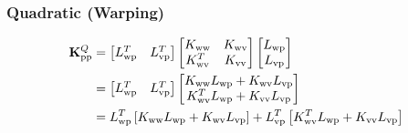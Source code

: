 \subsubsection{Quadratic (Warping)}
\[
\begin{aligned}
\mathbf{K}^Q_{\rm pp}
&= \begin{bmatrix}
    L_{\rm wp}^T & L_{\rm vp}^T
\end{bmatrix}
\begin{bmatrix}
    K_{\rm ww} & K_{\rm wv} \\
    K_{\rm wv}^T & K_{\rm vv}
\end{bmatrix}
\begin{bmatrix}
    L_{\rm wp} \\ L_{\rm vp}
\end{bmatrix} \\
&= \begin{bmatrix}
    L_{\rm wp}^T & L_{\rm vp}^T
\end{bmatrix}
\begin{bmatrix}
    K_{\rm ww}L_{\rm wp}+ K_{\rm wv}L_{\rm vp} \\
    K_{\rm wv}^T L_{\rm wp} + K_{\rm vv}L_{\rm vp}
\end{bmatrix} \\
&= L_{\rm wp}^{T} \left[
K_{\rm ww}L_{\rm wp} + K_{\rm wv}L_{\rm vp}
\right]
+L_{\rm vp}^T \left[
K_{\rm wv}^T L_{\rm wp} + K_{\rm vv}L_{\rm vp}
\right]
\end{aligned}
\]
